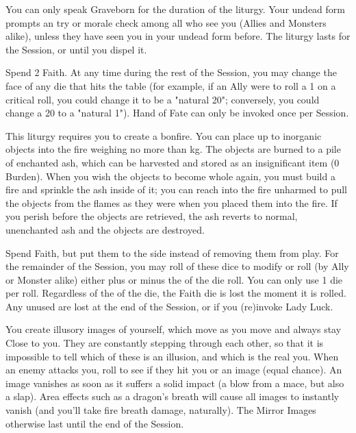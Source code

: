 \begin{multicols*}{2}
You can only speak Graveborn for the duration of the liturgy.  Your undead form prompts an \INSANITY try or morale check among all who see you (Allies and Monsters alike), unless they have seen you in your undead form before. The liturgy lasts for the Session, or until you dispel it. 

\LITURGY [
  Name = Hand of Fate,
  Link = arcana-mystery-hand-of-fate,
  Paradigm = Ruinous
]

Spend 2 Faith. At any time during the rest of the Session, you may change the face of any die that hits the table (for example, if an Ally were to roll a 1 on a critical roll, you could change it to be a "natural 20"; conversely, you could change a 20 to a "natural 1"). Hand of Fate can only be invoked once per Session. 

\LITURGY [
  Name = Incinerate,
  Link = arcana-mystery-incinerate,
  Paradigm = J{\UmlautO}tnar
]

This liturgy requires you to create a bonfire.  You can place up to \DICE inorganic objects into the fire weighing no more than \SUMDICE kg.  The objects are burned to a pile of enchanted ash, which can be harvested and stored as an insignificant item (0 Burden).  When you wish the objects to become whole again, you must build a fire and sprinkle the ash inside of it; you can reach into the fire unharmed to pull the objects from the flames as they were when you placed them into the fire.  If you perish before the objects are retrieved, the ash reverts to normal, unenchanted ash and the objects are destroyed.


\LITURGY [
  Name = Lady Luck,
  Link = arcana-lady-luck,
  Paradigm = Errant
]

Spend \DICE Faith, but put them to the side instead of removing them from play. For the remainder of the Session, you may roll  of these dice to modify  \RO or \RB roll (by Ally or Monster alike) either plus or minus the \SUMDICE of the die roll.  You can only use 1 die per roll.  Regardless of the \SUMDICE of the die, the Faith die is lost the moment it is rolled.  Any unused \DICE are lost at the end of the Session, or if you (re)invoke Lady Luck.


\LITURGY [
  Name = Mirror Image,
  Link = arcana-mystery-mirror-image,
  Paradigm = Cunning
]


You create \DICE illusory images of yourself, which move as you move and always stay Close to you. They are constantly stepping through each other, so that it is impossible to tell which of these is an illusion, and which is the real you. When an enemy attacks you, roll to see if they hit you or an image (equal chance). An image vanishes as soon as it suffers a solid impact (a blow from a mace, but also a slap). Area effects such as a dragon's breath will cause all images to instantly vanish (and you'll take fire breath damage, naturally). The Mirror Images otherwise last until the end of the Session.



\end{multicols*}
